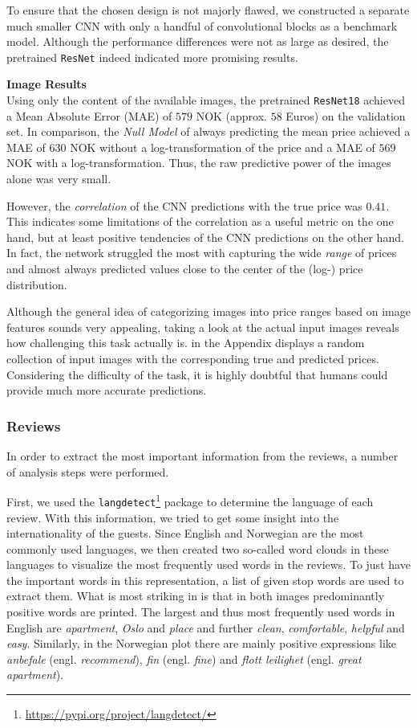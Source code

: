 To ensure that the chosen design is not majorly flawed, we constructed a separate much smaller CNN with only a handful of convolutional blocks as a benchmark model.
Although the performance differences were not as large as desired, the pretrained \texttt{ResNet} indeed indicated more promising results.


\textbf{Image Results} \\
Using only the content of the available images, the pretrained \texttt{ResNet18} achieved a Mean Absolute Error (MAE) of $579$ NOK (approx. $58$ Euros) on the validation set.
In comparison, the \emph{Null Model} of always predicting the mean price achieved a MAE of $630$ NOK without a log-transformation of the price and a MAE of $569$ NOK with a log-transformation.
Thus, the raw predictive power of the images alone was very small.

However, the \emph{correlation} of the CNN predictions with the true price was $0.41$.
This indicates some limitations of the correlation as a useful metric on the one hand, but at least positive tendencies of the CNN predictions on the other hand.
In fact, the network struggled the most with capturing the wide \emph{range} of prices and almost always predicted values close to the center of the (log-) price distribution.

Although the general idea of categorizing images into price ranges based on image features sounds very appealing, taking a look at the actual input images reveals how challenging this task actually is.
 in the Appendix displays a random collection of input images with the corresponding true and predicted prices.
Considering the difficulty of the task, it is highly doubtful that humans could provide much more accurate predictions.


\subsubsection{Reviews}

In order to extract the most important information from the reviews, a number of analysis steps were performed.

First, we used the \texttt{langdetect}\footnote{\url{https://pypi.org/project/langdetect/}} package to determine the language of each review.
With this information, we tried to get some insight into the internationality of the guests.
Since English and Norwegian are the most commonly used languages, we then created two so-called word clouds in these languages to visualize the most frequently used words in the reviews.
To just have the important words in this representation, a list of given stop words are used to extract them.
What is most striking in  is that in both images predominantly positive words are printed.
The largest and thus most frequently used words in English are \textit{apartment}, \textit{Oslo} and \textit{place} and further \textit{clean}, \textit{comfortable}, \textit{helpful} and \textit{easy}.
Similarly, in the Norwegian plot there are mainly positive expressions like \textit{anbefale} (engl. \emph{recommend}), \textit{fin} (engl. \emph{fine}) and \textit{flott leilighet} (engl. \emph{great apartment}).

